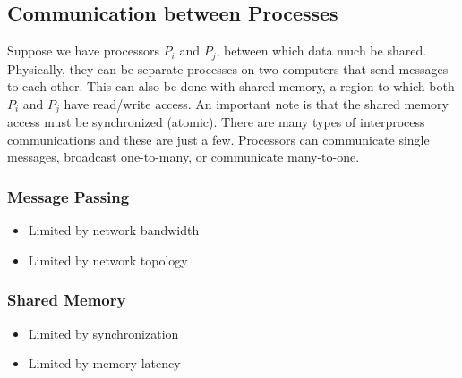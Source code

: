 \documentclass{math}
\begin{document}
\subsection*{Communication between Processes}
Suppose we have processors \( P_i \) and \( P_j \), between which data much be
shared. Physically, they can be separate processes on two computers that send
messages to each other. This can also be done with shared memory, a region to
which both \( P_i \) and \( P_j \) have read/write access. An important note
is that the shared memory access must be synchronized (atomic). There are many
types of interprocess communications and these are just a few. Processors can
communicate single messages, broadcast one-to-many, or communicate many-to-one.
\subsubsection*{Message Passing}
\begin{itemize}
  \item Limited by network bandwidth
  \item Limited by network topology
\end{itemize}
\subsubsection*{Shared Memory}
\begin{itemize}
  \item Limited by synchronization
  \item Limited by memory latency
\end{itemize}
\end{document}
